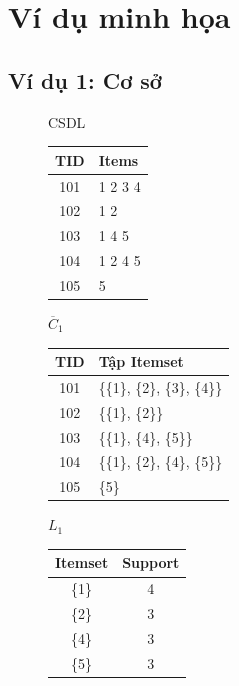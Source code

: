 \chapter[Ví dụ minh họa]{Ví dụ minh họa}
\label{cp:example}

\section{Ví dụ 1: Cơ sở}

\begin{figure}[htbp]
    \centering
    \renewcommand{\arraystretch}{1.2} %

    \begin{minipage}[t]{0.22\textwidth}
        \centering
        CSDL\\[4pt]
        \begin{tabular}{|c|l|}
        \hline
        TID & Items \\ \hline
        101 & 1 2 3 4 \\
        102 & 1 2 \\
        103 & 1 4 5 \\
        104 & 1 2 4 5 \\
        105 & 5 \\ \hline
        \end{tabular}
    \end{minipage}
    \hfill
    \begin{minipage}[t]{0.45\textwidth}
        \centering
        $\overline{C}_1$\\[4pt]
        \begin{tabular}{|c|l|}
        \hline
        TID & Tập Itemset \\ \hline
        101 & \{\{1\}, \{2\}, \{3\}, \{4\}\} \\
        102 & \{\{1\}, \{2\}\} \\
        103 & \{\{1\}, \{4\}, \{5\}\} \\
        104 & \{\{1\}, \{2\}, \{4\}, \{5\}\} \\
        105 & \{5\} \\ \hline
        \end{tabular}
    \end{minipage}
    \hfill
    \begin{minipage}[t]{0.25\textwidth}
        \centering
        $L_1$\\[4pt]
        \begin{tabular}{|c|c|}
        \hline
        Itemset & Support \\ \hline
        \{1\} & 4 \\
        \{2\} & 3 \\
        \{4\} & 3 \\
        \{5\} & 3 \\ \hline
        \end{tabular}
    \end{minipage}


\end{figure}
